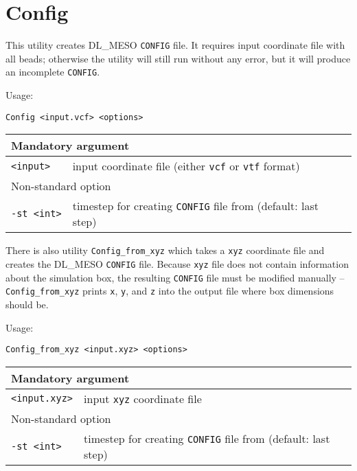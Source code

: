 \section{Config} \label{sec:Config}

This utility creates DL\_MESO \texttt{CONFIG} file. It requires input
coordinate file with all beads; otherwise the utility will still run
without any error, but it will produce an incomplete \texttt{CONFIG}.

Usage:

\vspace{1em}
\noindent
\texttt{Config <input.vcf> <options>}

\vspace{1em}

\noindent
\begin{tabular}{p{}p{}}
  \toprule
  \multicolumn{2}{l}{Mandatory argument} \\
  \midrule
  \texttt{<input>}  & input coordinate file (either \texttt{vcf} or
    \texttt{vtf} format)\\
  \toprule
  \multicolumn{2}{l}{Non-standard option} \\
  \midrule
  \texttt{-st <int>} & timestep for creating \texttt{CONFIG} file from
    (default: last step) \\
  \bottomrule
\end{tabular}

\vspace{1em}
There is also utility \texttt{Config\_from\_xyz} which takes a \texttt{xyz}
coordinate file and creates the DL\_MESO \texttt{CONFIG} file. Because
\texttt{xyz} file does not contain information about the simulation box,
the resulting \texttt{CONFIG} file must be modified manually --
\texttt{Config\_from\_xyz} prints \texttt{x}, \texttt{y}, and \texttt{z}
into the output file where box dimensions should be.

Usage:

\vspace{1em}
\noindent
\texttt{Config\_from\_xyz <input.xyz> <options>}

\vspace{1em}

\noindent
\begin{tabular}{p{}p{}}
  \toprule
  \multicolumn{2}{l}{Mandatory argument} \\
  \midrule
  \texttt{<input.xyz>}  & input \texttt{xyz} coordinate file \\
  \toprule
  \multicolumn{2}{l}{Non-standard option} \\
  \midrule
  \texttt{-st <int>} & timestep for creating \texttt{CONFIG} file from
    (default: last step) \\
  \bottomrule
\end{tabular}
